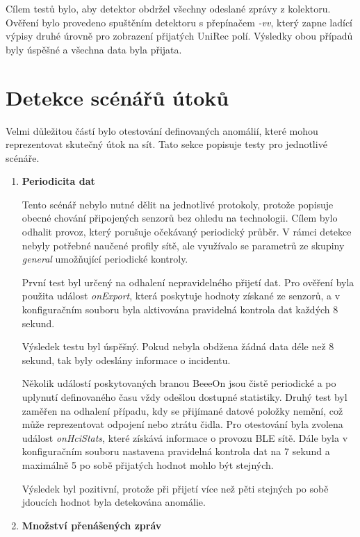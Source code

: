 Cílem testů bylo, aby detektor obdržel všechny odeslané zprávy z kolektoru. Ověření bylo provedeno
spuštěním detektoru s přepínačem \textit{-vv}, který zapne ladící výpisy druhé úrovně pro zobrazení 
přijatých UniRec polí. Výsledky obou případů byly úspěšné a všechna data byla přijata.

\section{Detekce scénářů útoků} \label{testAttack}
Velmi důležitou částí bylo otestování definovaných anomálií, které mohou reprezentovat skutečný
útok na sít. Tato sekce popisuje testy pro jednotlivé scénáře.

  \begin{enumerate}
    \item \textbf{Periodicita dat}
    
    Tento scénář nebylo nutné dělit na jednotlivé protokoly, protože popisuje obecné chování 
    připojených senzorů bez ohledu na technologii. Cílem bylo odhalit provoz, který porušuje
    očekávaný periodický průběr. V rámci detekce nebyly potřebné naučené profily sítě, 
    ale využívalo se parametrů ze skupiny \textit{general} umožňující periodické kontroly.
    
    První test byl určený na odhalení nepravidelného přijetí dat. Pro ověření byla použita událost
    \textit{onExport}, která poskytuje hodnoty získané ze senzorů, a v konfiguračním souboru byla 
    aktivována pravidelná kontrola dat každých 8 sekund.
    
    Výsledek testu byl úspěšný. Pokud nebyla obdžena žádná data déle než 8 sekund, tak byly
    odeslány informace o incidentu.
    
    Několik událostí poskytovaných branou BeeeOn jsou čistě periodické a po uplynutí definovaného
    času vždy odešlou dostupné statistiky. Druhý test byl zaměřen na odhalení případu, kdy se 
    přijímané datové položky nemění, což může reprezentovat odpojení nebo ztrátu čidla. Pro 
    otestování byla zvolena událost \textit{onHciStats}, které získává informace o provozu BLE sítě. 
    Dále byla v konfiguračním souboru nastavena pravidelná kontrola dat na 7 sekund a maximálně 
    5 po sobě přijatých hodnot mohlo být stejných. 
    
    Výsledek byl pozitivní, protože při přijetí více než pěti stejných po sobě jdoucích
    hodnot byla detekována anomálie.
    
    \item \textbf{Množství přenášených zpráv}
    

\end{enumerate}
